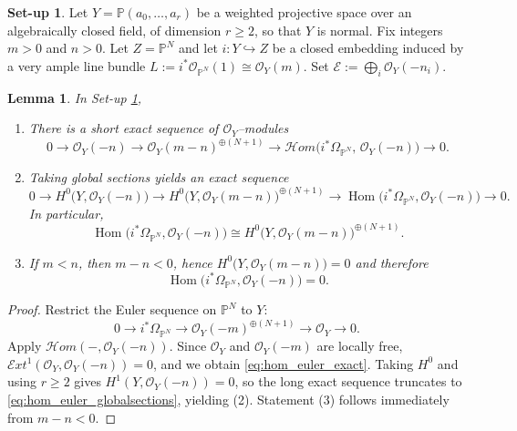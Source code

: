 \documentclass[11pt,twoside]{amsart}
\theoremstyle{plain}
\numberwithin{equation}{section}
\newtheorem{lemma}[theorem]{Lemma}
\theoremstyle{definition}
\newtheorem{set-up}[theorem]{Set-up}
\begin{document}
\begin{set-up}\label{embedding_of_WPS_in_PN}
Let $Y=\mathbb P(a_0,\dots,a_r)$ be a weighted projective space over an algebraically closed field,
of dimension $r\ge 2$, so that $Y$ is normal. Fix integers $m>0$ and $n>0$.
Let $Z=\mathbb P^N$ and let $i:Y\hookrightarrow Z$ be a closed embedding induced by a very ample line bundle
$L:=i^*\mathcal O_{\mathbb P^N}(1)\cong \mathcal O_Y(m)$.
Set $\mathcal E:=\bigoplus_i\mathcal O_Y(-n_i)$.
\end{set-up}
\begin{lemma}\label{lemma:hom_euler_wps}
In Set-up \ref{embedding_of_WPS_in_PN},

\begin{enumerate}
\item[\textup{(1)}] There is a short exact sequence of $\mathcal O_Y$--modules
\begin{equation}\label{eq:hom_euler_exact}
0 \longrightarrow \mathcal O_Y(-n)\longrightarrow
\mathcal O_Y(m-n)^{\oplus (N+1)}
\longrightarrow
\mathcal H\!om\!\bigl(i^*\Omega_{\mathbb P^N},\,\mathcal O_Y(-n)\bigr)
\longrightarrow 0.
\end{equation}

\item[\textup{(2)}] Taking global sections yields an exact sequence
\begin{equation}\label{eq:hom_euler_globalsections}
0 \longrightarrow H^0\!\bigl(Y,\mathcal O_Y(-n)\bigr)\longrightarrow
H^0\!\bigl(Y,\mathcal O_Y(m-n)\bigr)^{\oplus (N+1)}
\longrightarrow
\operatorname{Hom}\bigl(i^*\Omega_{\mathbb P^N},\mathcal O_Y(-n)\bigr)
\longrightarrow 0.
\end{equation}
In particular,
\[
\operatorname{Hom}\bigl(i^*\Omega_{\mathbb P^N},\mathcal O_Y(-n)\bigr)
\cong
H^0\!\bigl(Y,\mathcal O_Y(m-n)\bigr)^{\oplus (N+1)}.
\]

\item[\textup{(3)}] If $m<n$, then $m-n<0$, hence $H^0\!\bigl(Y,\mathcal O_Y(m-n)\bigr)=0$ and therefore
\[
\operatorname{Hom}\bigl(i^*\Omega_{\mathbb P^N},\mathcal O_Y(-n)\bigr)=0.
\]
\end{enumerate}

\end{lemma}

\begin{proof}
Restrict the Euler sequence on $\mathbb P^N$ to $Y$:
\[
0\to i^*\Omega_{\mathbb P^N}\to \mathcal O_Y(-m)^{\oplus (N+1)}\to \mathcal O_Y\to 0.
\]
Apply $\mathcal H\!om(-,\mathcal O_Y(-n))$.
Since $\mathcal O_Y$ and $\mathcal O_Y(-m)$ are locally free, $\mathcal E\!xt^1(\mathcal O_Y,\mathcal O_Y(-n))=0$,
and we obtain \eqref{eq:hom_euler_exact}. Taking $H^0$ and using $r\ge 2$ gives
$H^1(Y,\mathcal O_Y(-n))=0$, so the long exact sequence truncates to \eqref{eq:hom_euler_globalsections},
yielding (2). Statement (3) follows immediately from $m-n<0$.
\end{proof}
\end{document}
